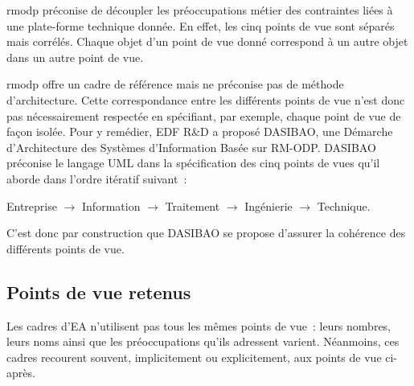 \gls{rmodp} préconise de découpler les préoccupations métier des
contraintes liées à une plate-forme technique donnée. En effet, les cinq points de vue sont séparés mais corrélés. Chaque objet d'un point de vue donné correspond à un autre objet dans un autre point de vue.

\gls{rmodp} offre un cadre de référence mais ne préconise pas de méthode d'architecture. Cette correspondance entre les différents points de vue n'est donc pas nécessairement respectée en spécifiant, par exemple, chaque point de vue de façon isolée.
Pour y remédier, EDF R\&D a proposé DASIBAO, une Démarche d’Architecture des
Systèmes d’Information Basée sur RM-ODP. DASIBAO préconise le langage UML dans la
spécification des cinq points de vues qu'il aborde dans l'ordre itératif suivant~:

\begin{center}
Entreprise $\rightarrow$ Information $\rightarrow$ Traitement $\rightarrow$ Ingénierie $\rightarrow$ Technique.
\end{center}

C'est donc par construction que DASIBAO se propose d'assurer la cohérence des
différents points de vue.




\subsection{Points de vue retenus}
Les cadres d'EA n'utilisent pas tous les mêmes points de vue~: leurs nombres,
leurs noms ainsi que les préoccupations qu'ils adressent varient. Néanmoins,
ces cadres recourent souvent, implicitement ou explicitement, aux points de vue
ci-après.

